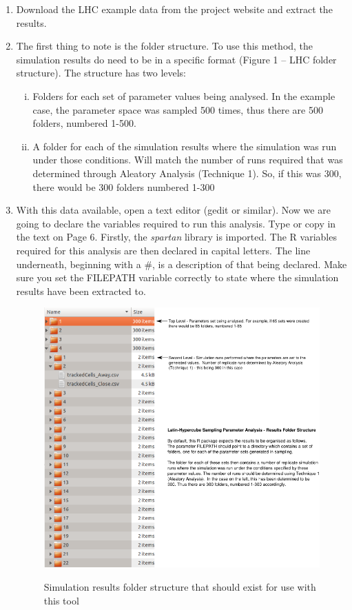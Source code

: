 \documentclass[a4paper,11pt]{article}
\begin{document}
\begin{enumerate}
\item Download the LHC example data from the project website and extract the results.
\item The first thing to note is the folder structure.  To use this method, the simulation results do need to be in a specific format (Figure 1 – LHC folder structure).  The structure has two levels:
\begin{enumerate}[(i)]
\item Folders for each set of parameter values being analysed. In the example case, the parameter space was sampled 500 times, thus there are 500 folders, numbered 1-500.
\item A folder for each of the simulation results where the simulation was run under those conditions. Will match the number of runs required that was determined through Aleatory Analysis (Technique 1). So, if this was 300, there would be 300 folders numbered 1-300
\end{enumerate}
\item With this data available, open a text editor (gedit or similar).  Now we are going to declare the variables required to run this analysis. Type or copy in the text on Page 6. Firstly, the \textit{spartan} library is imported. The R variables required for this analysis are then declared in capital letters. The line underneath, beginning with a \#, is a description of that being declared. Make sure you set the FILEPATH variable correctly to state where the simulation results have been extracted to.

\begin{figure}
\centering
    \includegraphics[width=\textwidth]{LHC_Folder_Struc.png}\\ \noindent
    \caption{Simulation results folder structure that should exist for use with this tool}
    \label{LHC_Folders}
    \newpage 
\end{figure}


\end{enumerate}
\end{document}
